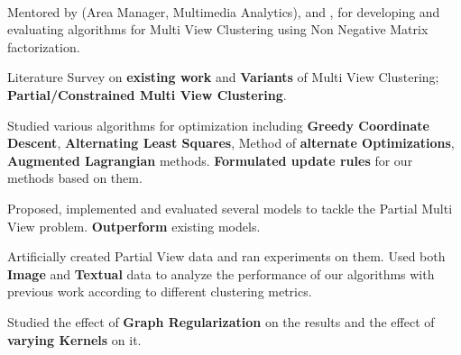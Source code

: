 \documentclass[a4paper]{norm-resume}
\begin{document}
	\begin{changemargin}{1.0cm}{0.0cm} 
	{
	\large{}  \\
	\small{Mentored by  (Area Manager, Multimedia Analytics),  and , for developing and evaluating algorithms for Multi View Clustering using Non Negative Matrix factorization.}
	\begin{tightitemize}
	\small
	{ 	
	\item Literature Survey on \textbf{existing work} and \textbf{Variants} of Multi View Clustering; \textbf{Partial/Constrained Multi View Clustering}.
	\item Studied various algorithms for optimization including \textbf{Greedy Coordinate Descent}, \textbf{Alternating Least Squares}, Method of \textbf{alternate Optimizations}, \textbf{Augmented Lagrangian} methods. \textbf{Formulated update rules} for our methods based on them.
	\item Proposed, implemented and evaluated several models to tackle the Partial Multi View problem. \textbf{Outperform} existing models.
	\item Artificially created Partial View data and ran experiments on them. Used both \textbf{Image} and \textbf{Textual} data to analyze the performance of our algorithms with previous work according to different clustering metrics.
	\item Studied the effect of \textbf{Graph Regularization} on the results and the effect of \textbf{varying Kernels} on it. 	
	}
	\end{tightitemize}	
	}
	\end{changemargin} 	
	
	\vspace{1mm}
	
				
	
\vspace{-2mm} %
\end{document}
